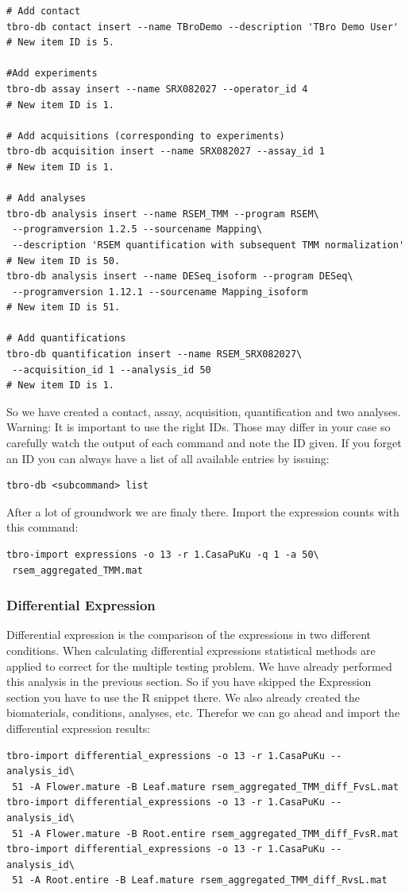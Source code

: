 \documentclass[english]{scrartcl}
\begin{document}
\begin{lstlisting}
# Add contact
tbro-db contact insert --name TBroDemo --description 'TBro Demo User' 
# New item ID is 5.

#Add experiments 
tbro-db assay insert --name SRX082027 --operator_id 4
# New item ID is 1.

# Add acquisitions (corresponding to experiments)
tbro-db acquisition insert --name SRX082027 --assay_id 1
# New item ID is 1.

# Add analyses 
tbro-db analysis insert --name RSEM_TMM --program RSEM\
 --programversion 1.2.5 --sourcename Mapping\
 --description 'RSEM quantification with subsequent TMM normalization'
# New item ID is 50.
tbro-db analysis insert --name DESeq_isoform --program DESeq\
 --programversion 1.12.1 --sourcename Mapping_isoform
# New item ID is 51.

# Add quantifications
tbro-db quantification insert --name RSEM_SRX082027\
 --acquisition_id 1 --analysis_id 50
# New item ID is 1.
\end{lstlisting}

So we have created a contact, assay, acquisition, quantification and two
analyses. Warning: It is important to use the right IDs. Those may differ in
your case so carefully watch the output of each command and note the ID given.
If you forget an ID you can always have a list of all available entries by
issuing:
\begin{lstlisting}
tbro-db <subcommand> list
\end{lstlisting}
After a lot of groundwork we are finaly there. Import the expression counts with
this command:
\begin{lstlisting}
tbro-import expressions -o 13 -r 1.CasaPuKu -q 1 -a 50\
 rsem_aggregated_TMM.mat
\end{lstlisting}

\subsubsection{Differential Expression}
Differential expression is the comparison of the expressions in two different
conditions. When calculating differential expressions statistical methods are
applied to correct for the multiple testing problem. We have already performed
this analysis in the previous section. So if you have skipped the Expression
section you have to use the R snippet there. We also already created the
biomaterials, conditions, analyses, etc. Therefor we can go ahead and import the
differential expression results:
\begin{lstlisting}
tbro-import differential_expressions -o 13 -r 1.CasaPuKu --analysis_id\
 51 -A Flower.mature -B Leaf.mature rsem_aggregated_TMM_diff_FvsL.mat
tbro-import differential_expressions -o 13 -r 1.CasaPuKu --analysis_id\
 51 -A Flower.mature -B Root.entire rsem_aggregated_TMM_diff_FvsR.mat
tbro-import differential_expressions -o 13 -r 1.CasaPuKu --analysis_id\
 51 -A Root.entire -B Leaf.mature rsem_aggregated_TMM_diff_RvsL.mat
\end{lstlisting}
\end{document}
